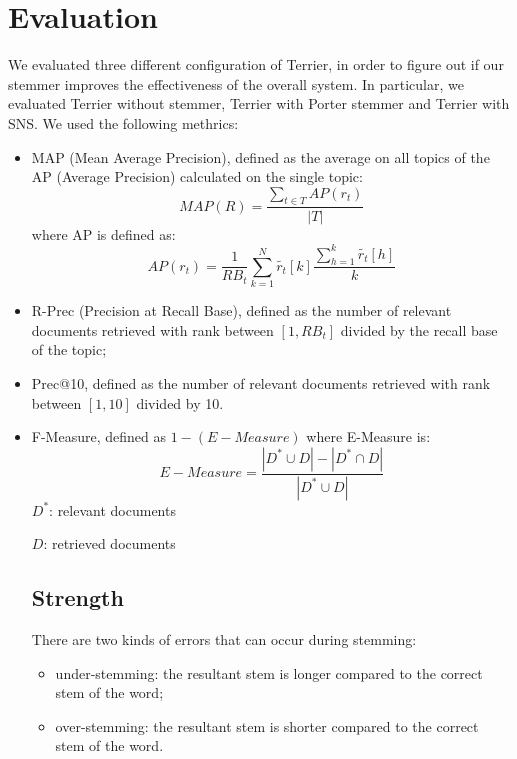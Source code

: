 \section{Evaluation}
We evaluated three different configuration of Terrier, in order to figure out if our stemmer improves the effectiveness of the overall system. In particular, we evaluated Terrier without stemmer, Terrier with Porter stemmer and Terrier with SNS. We used the following methrics:

\begin{itemize}
\item MAP (Mean Average Precision), defined as the average on all topics of the AP (Average Precision) calculated on the single topic:
\begin{equation}
MAP(R) = \frac{\sum_{t \in T}AP(r_t)}{|T|}
\end{equation}
where AP is defined as:
\begin{equation}
AP(r_t)=\frac{1}{RB_t}\sum_{k=1}^{N}\widetilde{r_t}[k]\frac{\sum_{h=1}^{k}\widetilde{r_t}[h]}{k}
\end{equation}

\item R-Prec (Precision at Recall Base), defined as the number of relevant documents retrieved with rank between $[1,RB_t]$ divided by the recall base of the topic;

\item Prec@10, defined as the number of relevant documents retrieved with rank between $[1, 10]$ divided by 10.

\item F-Measure, defined as $1 - (E-Measure)$ where E-Measure is:
\begin{equation}
E-Measure=\frac{|D^{*}\cup D|-|D^{*}\cap D|}{|D^{*}\cup D|}
\end{equation}
$D^{*}$: relevant documents

$D$: retrieved documents

\subsection{Strength}
There are two kinds of errors that can occur during stemming:

\begin{itemize}
\item under-stemming: the resultant stem is longer compared to the correct stem of the word;
\item over-stemming: the resultant stem is shorter compared to the correct stem of the word.
\end{itemize}


\end{itemize}
